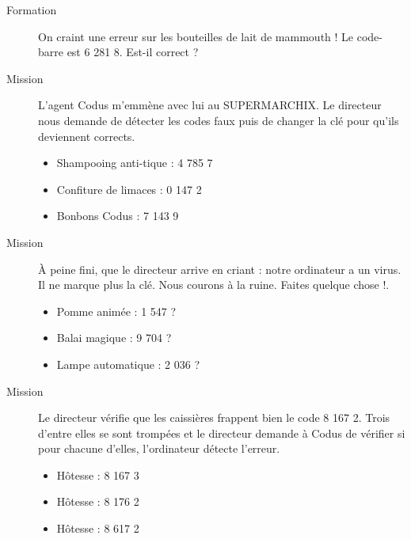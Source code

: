 \begin{description}
  \item[Formation] On craint une erreur sur les bouteilles de lait de mammouth ! Le code-barre est 6 281 8. Est-il correct ?
\par
{}
\item[Mission ] L'agent Codus m'emmène avec lui au
  SUPERMARCHIX. Le directeur nous demande de détecter les codes faux
  puis de changer la clé pour qu'ils deviennent corrects.
  \begin{itemize}
  \item Shampooing anti-tique : 4 785 7
  \item Confiture de limaces : 0 147 2
  \item Bonbons Codus : 7 143 9
  \end{itemize}
\item[Mission ] \`A peine fini, que le directeur arrive en criant
  : \og notre ordinateur a un virus. Il ne marque plus la clé. Nous
  courons à la ruine. Faites quelque chose !\fg.
  \begin{itemize}
  \item Pomme animée : 1 547 ?
  \item Balai magique : 9 704 ?
  \item Lampe automatique : 2 036 ?
  \end{itemize}
\item[Mission ] Le directeur vérifie que les caissières frappent
  bien le code 8 167 2. Trois d'entre elles se sont trompées et le
  directeur demande à Codus de vérifier si pour chacune d'elles,
  l'ordinateur détecte l'erreur.
  \begin{itemize}
  \item Hôtesse  : 8 167 3
  \item Hôtesse  : 8 176 2
  \item Hôtesse  : 8 617 2
  \end{itemize}
\end{description}